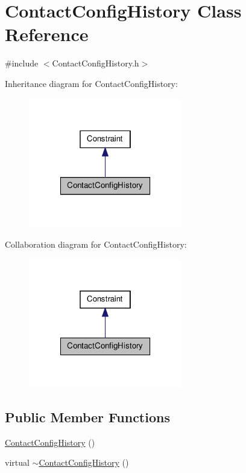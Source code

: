 \hypertarget{classContactConfigHistory}{\section{\-Contact\-Config\-History \-Class \-Reference}
\label{classContactConfigHistory}
}


{\ttfamily \#include $<$\-Contact\-Config\-History.\-h$>$}



\-Inheritance diagram for \-Contact\-Config\-History\-:\nopagebreak
\begin{figure}[H]
\begin{center}
\leavevmode
\includegraphics[width=190pt]{classContactConfigHistory__inherit__graph}
\end{center}
\end{figure}


\-Collaboration diagram for \-Contact\-Config\-History\-:\nopagebreak
\begin{figure}[H]
\begin{center}
\leavevmode
\includegraphics[width=190pt]{classContactConfigHistory__coll__graph}
\end{center}
\end{figure}
\subsection*{\-Public \-Member \-Functions}
\begin{DoxyCompactItemize}
\item 
\hyperlink{classContactConfigHistory_aa2ff8c4c2b05ca2168c5ea61bfbeb9ec}{\-Contact\-Config\-History} ()
\item 
virtual \hyperlink{classContactConfigHistory_a2b84c6e1ed477c052a18c0933c3988cf}{$\sim$\-Contact\-Config\-History} ()
\end{DoxyCompactItemize}
